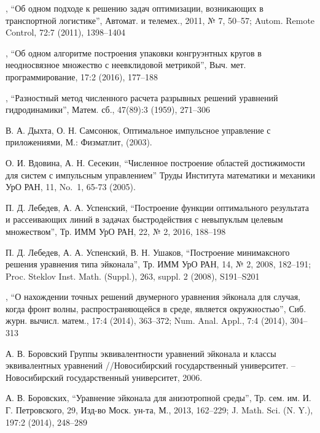 \pagebreak
\begin{thebibliography}{99}


, “Об одном подходе к
  решению задач оптимизации, возникающих в транспортной логистике”,
  Автомат. и телемех., 2011, № 7, 50–57; Autom. Remote Control, 72:7
  (2011), 1398–1404

, “Об одном
  алгоритме построения упаковки конгруэнтных кругов в неодносвязное
  множество с неевклидовой метрикой”, Выч. мет. программирование, 17:2
  (2016), 177–188

, “Разностный метод численного расчета
  разрывных решений уравнений гидродинамики”, Матем. сб., 47(89):3
  (1959), 271–306
  
 {В. А. Дыхта, О. Н. Самсонюк}, Оптимальное импульсное
  управление с приложениями, М.: Физматлит, (2003).

 {О. И. Вдовина, А. Н. Сесекин}, ``Численное построение
  областей достижимости для систем с импульсным управлением'' Труды
  Института математики и механики УрО РАН, 11, No.~1, 65-73 (2005).

 {П. Д. Лебедев, А. А. Успенский}, “Построение функции
  оптимального результата и рассеивающих линий в задачах
  быстродействия с невыпуклым целевым множеством”, Тр. ИММ УрО РАН,
  22, № 2, 2016, 188–198

  
 {П. Д. Лебедев, А. А. Успенский, В. Н. Ушаков},
  “Построение минимаксного решения уравнения типа эйконала”, Тр. ИММ
  УрО РАН, 14, № 2, 2008, 182–191; Proc. Steklov Inst. Math. (Suppl.),
  263, suppl. 2 (2008), S191–S201
  
, “О нахождении точных решений двумерного
  уравнения эйконала для случая, когда фронт волны, распространяющейся
  в среде, является окружностью”, Сиб. журн. вычисл. матем., 17:4
  (2014), 363–372; Num. Anal. Appl., 7:4 (2014), 304–313

 {А. В. Боровский} Группы эквивалентности уравнений
  эйконала и классы эквивалентных уравнений //Новосибирский
  государственный университет. – Новосибирский государственный
  университет, 2006.

 {А. В. Боровских}, “Уравнение эйконала для анизотропной
  среды”, Тр. сем. им. И. Г. Петровского, 29, Изд-во Моск. ун-та, М.,
  2013, 162–229; J. Math. Sci. (N. Y.), 197:2 (2014), 248–289


\end{thebibliography}
